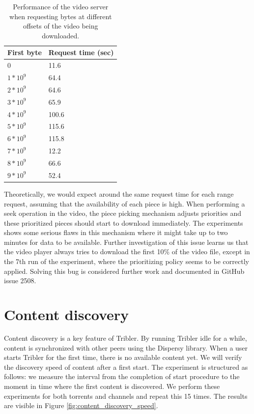 \begin{table}[]
	\centering
	\begin{tabular}{|l|l|}
		\hline
		First byte               & Request time (sec) \\ \hline
		0                        & 11.6                  \\ \hline
		$ 1 * 10^9 $ & 64.4                  \\ \hline
		$ 2 * 10^9 $ & 64.6                  \\ \hline
		$ 3 * 10^9 $ & 65.9                   \\ \hline
		$ 4 * 10^9 $ & 100.6                   \\ \hline
		$ 5 * 10^9 $ & 115.6                   \\ \hline
		$ 6 * 10^9 $ & 115.8                  \\ \hline
		$ 7 * 10^9 $ & 12.2                  \\ \hline
		$ 8 * 10^9 $ & 66.6                   \\ \hline
		$ 9 * 10^9 $ & 52.4                   \\ \hline
	\end{tabular}
	\caption{Performance of the video server when requesting bytes at different offsets of the video being downloaded.}
	\label{table:video_player_seek_times}
\end{table}

Theoretically, we would expect around the same request time for each range request, assuming that the availability of each piece is high. When performing a seek operation in the video, the piece picking mechanism adjusts priorities and these prioritized pieces should start to download immediately. The experiments shows some serious flaws in this mechanism where it might take up to two minutes for data to be available. Further investigation of this issue learns us that the video player always tries to download the first 10\% of the video file, except in the 7th run of the experiment, where the prioritizing policy seems to be correctly applied. Solving this bug is considered further work and documented in GitHub issue 2508\cite{githubissue2508}.

\section{Content discovery}
\label{sec:content-discovery}
Content discovery is a key feature of Tribler. By running Tribler idle for a while, content is synchronized with other peers using the Dispersy library. When a user starts Tribler for the first time, there is no available content yet. We will verify the discovery speed of content after a first start. The experiment is structured as follows: we measure the interval from the completion of start procedure to the moment in time where the first content is discovered. We perform these experiments for both torrents and channels and repeat this 15 times. The results are visible in Figure \ref{fig:content_discovery_speed}.\\

